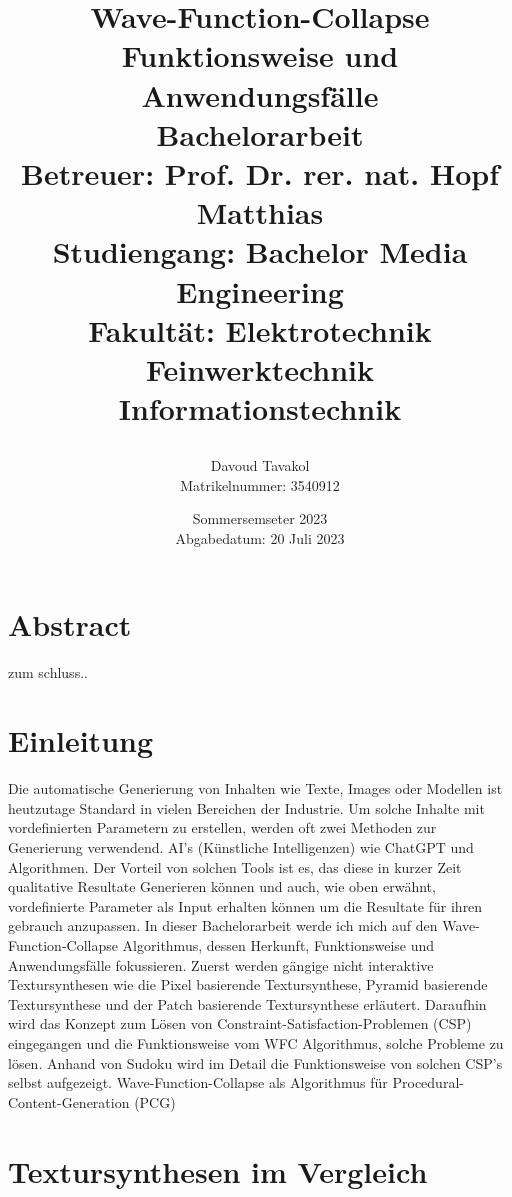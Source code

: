 \documentclass[12pt, a4paper,twoside,openright]{report}
\title{
{\huge Wave-Function-Collapse}\\
{\large Funktionsweise und Anwendungsfälle}\\
{\vspace{10mm}}
{\large Bachelorarbeit}\\
{\large Betreuer: Prof. Dr. rer. nat. Hopf Matthias}\\
{\vspace{10mm}}
{\large Studiengang: Bachelor Media Engineering}\\
{\large Fakultät: Elektrotechnik Feinwerktechnik Informationstechnik}\\

\author{
    Davoud Tavakol \\ Matrikelnummer: 3540912
}
\date{Sommersemseter 2023 \\ Abgabedatum: 20 Juli 2023}
}
\begin{document}
\maketitle



{\let\clearpage\relax\chapter*{Abstract}}

zum schluss..

\tableofcontents

\chapter{Einleitung}

Die automatische Generierung von Inhalten wie Texte, Images oder Modellen ist heutzutage Standard in vielen Bereichen der Industrie.
Um solche Inhalte mit vordefinierten Parametern zu erstellen, werden oft zwei Methoden zur Generierung verwendend.
AI's {(Künstliche Intelligenzen)} wie ChatGPT und Algorithmen.
Der Vorteil von solchen Tools ist es, das diese in kurzer Zeit qualitative Resultate Generieren können und auch, wie oben erwähnt, vordefinierte Parameter als Input erhalten können
um die Resultate für ihren gebrauch anzupassen.
In dieser Bachelorarbeit werde ich mich auf den Wave-Function-Collapse Algorithmus, dessen Herkunft, Funktionsweise und Anwendungsfälle fokussieren.
Zuerst werden gängige nicht interaktive Textursynthesen wie die Pixel basierende Textursynthese, Pyramid basierende Textursynthese und der Patch basierende Textursynthese erläutert.
Daraufhin wird das Konzept zum Lösen von Constraint-Satisfaction-Problemen {(CSP)} eingegangen und die Funktionsweise vom WFC Algorithmus, solche Probleme zu lösen.
Anhand von Sudoku wird im Detail die Funktionsweise von solchen CSP's selbst aufgezeigt.
Wave-Function-Collapse als Algorithmus für Procedural-Content-Generation {(PCG)}

\chapter{Textursynthesen im Vergleich}
\end{document}
